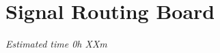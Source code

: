 
\chapter{Signal Routing Board}  %

\label{Signal Routing Board} 
%
%

\textit{Estimated time 0h XXm}
